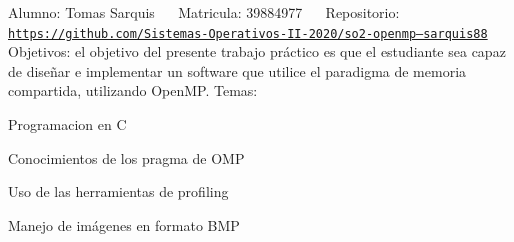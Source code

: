 Alumno\+: Tomas Sarquis~\newline
~\newline
Matricula\+: 39884977~\newline
~\newline
Repositorio\+: \href{https://github.com/Sistemas-Operativos-II-2020/so2-openmp&ndash;sarquis88}{\tt https\+://github.\+com/\+Sistemas-\/\+Operativos-\/\+I\+I-\/2020/so2-\/openmp--sarquis88}~\newline
~\newline
Objetivos\+: el objetivo del presente trabajo práctico es que el estudiante sea capaz de diseñar e implementar un software que utilice el paradigma de memoria compartida, utilizando Open\+MP. Temas\+:
\begin{DoxyItemize}
\item Programacion en C~\newline

\item Conocimientos de los pragma de O\+MP~\newline

\item Uso de las herramientas de profiling~\newline

\item Manejo de imágenes en formato B\+MP~\newline
~\newline

\end{DoxyItemize}